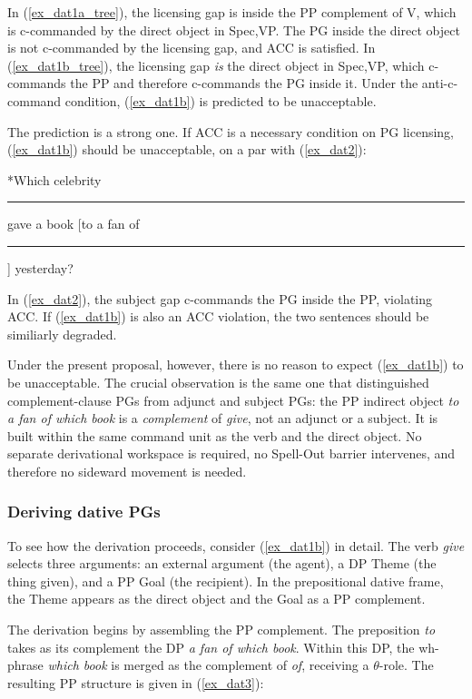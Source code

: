 \documentclass[12pt]{article}
\newcommand{\gap}{\rule{1.25em}{.5pt}} %
\begin{document}
\noindent
In (\ref{ex_dat1a_tree}), the licensing gap is inside the PP complement of V, which is c-commanded by the direct object in Spec,VP. The PG inside the direct object is not c-commanded by the licensing gap, and ACC is satisfied. In (\ref{ex_dat1b_tree}), the licensing gap \textit{is} the direct object in Spec,VP, which c-commands the PP and therefore c-commands the PG inside it. Under the anti-c-command condition, (\ref{ex_dat1b}) is predicted to be unacceptable.

The prediction is a strong one. If ACC is a necessary condition on PG licensing, (\ref{ex_dat1b}) should be unacceptable, on a par with (\ref{ex_dat2}):

\ex \label{ex_dat2}
*Which celebrity \gap{} gave a book [to a fan of \gap{}] yesterday?
\xe

\noindent
In (\ref{ex_dat2}), the subject gap c-commands the PG inside the PP, violating ACC. If (\ref{ex_dat1b}) is also an ACC violation, the two sentences should be similiarly degraded.

Under the present proposal, however, there is no reason to expect (\ref{ex_dat1b}) to be unacceptable. The crucial observation is the same one that distinguished complement-clause PGs from adjunct and subject PGs: the PP indirect object \textit{to a fan of which book} is a \textit{complement} of \textit{give}, not an adjunct or a subject. It is built within the same command unit as the verb and the direct object. No separate derivational workspace is required, no Spell-Out barrier intervenes, and therefore no sideward movement is needed.

\subsubsection{Deriving dative PGs}

To see how the derivation proceeds, consider (\ref{ex_dat1b}) in detail. The verb \textit{give} selects three arguments: an external argument (the agent), a DP Theme (the thing given), and a PP Goal (the recipient). In the prepositional dative frame, the Theme appears as the direct object and the Goal as a PP complement.

The derivation begins by assembling the PP complement. The preposition \textit{to} takes as its complement the DP \textit{a fan of which book}. Within this DP, the wh-phrase \textit{which book} is merged as the complement of \textit{of}, receiving a $\theta$-role. The resulting PP structure is given in (\ref{ex_dat3}):
\end{document}
